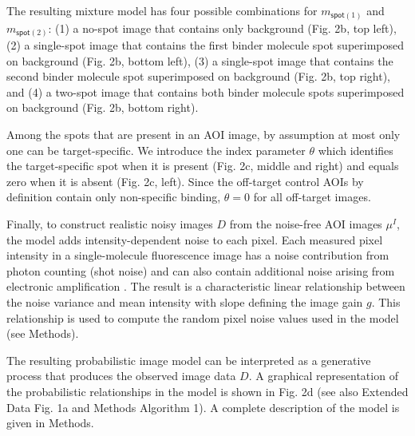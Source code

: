 The resulting mixture model has four possible combinations for $m_{\mathsf{spot}(1)}$ and $m_{\mathsf{spot}(2)}$: (1) a no-spot image that contains only background (Fig. 2b, top left), (2) a single-spot image that contains the first binder molecule spot superimposed on background (Fig. 2b, bottom left), (3) a single-spot image that contains the second binder molecule spot superimposed on background (Fig. 2b, top right), and (4) a two-spot image that contains both binder molecule spots superimposed on background (Fig. 2b, bottom right).

Among the spots that are present in an AOI image, by assumption at most only one can be target-specific. We introduce the index parameter $\theta$ which identifies the target-specific spot  when it is present (Fig. 2c, middle and right) and equals zero when it is absent (Fig. 2c, left). Since the off-target control AOIs by definition contain only non-specific binding, $\theta = 0$ for all off-target images. 

Finally, to construct realistic noisy images $D$ from the noise-free AOI images $\mu^I$, the model adds intensity-dependent noise to each pixel.  Each measured pixel intensity in a single-molecule fluorescence image has a noise contribution from photon counting (shot noise) and can also contain additional noise arising from electronic amplification \cite{Van_Vliet1998-jk}. The result is a characteristic linear relationship between the noise variance and mean intensity with slope defining the image gain $g$. This relationship is used to compute the random pixel noise values used in the model (see Methods).

The resulting probabilistic image model can be interpreted as a generative process that produces the observed image data $D$. A graphical representation of the probabilistic relationships in the model is shown in Fig. 2d (see also Extended Data Fig. 1a and Methods Algorithm 1). A complete description of the model is given in Methods.  

